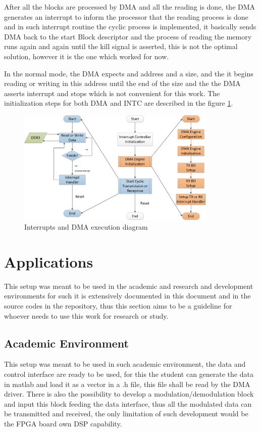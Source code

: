 After all the blocks are processed by DMA and all the reading is done, the DMA
generates an interrupt to inform the processor that the reading process is done
and in such interrupt routine the cyclic process is implemented, it basically
sends DMA back to the start Block descriptor and the process of reading the
memory runs again and again until the kill signal is asserted, this is not the
optimal solution, however it is the one which worked for now.

 In the normal mode, the DMA expects and address and a size, and the it begins
reading or writing in this address until the end of the size and the the DMA
asserts interrupt and stops which is not convenient for this work. The
initialization steps for both DMA and INTC are described in the figure
\ref{fig:intcdmainit}.

\begin{figure}[htbp]
    \centering
    \includegraphics[width=0.85\textwidth]{./figures/dma_intc_driver}
    \caption{ Interrupts and DMA execution diagram
    \label{fig:intcdmainit}}
\end{figure}

\section{Applications}

This setup was meant to be used in the academic and research and development
environments for such it is extensively documented in this document and in the
source codes in the repository, thus this section aims to be a guideline for
whoever needs to use this work for research or study.

\subsection{Academic Environment}

This setup was meant to be used in such academic environment, the data and control
interface are ready to be used, for this the student can generate the data in
matlab and load it as a vector in a .h file, this file shall be read by the DMA
driver.
There is also the possibility to develop a modulation/demodulation block
and input this block feeding the data interface, thus all the modulated data can
be transmitted and received, the only limitation of such development would be the
FPGA board own DSP capability.

